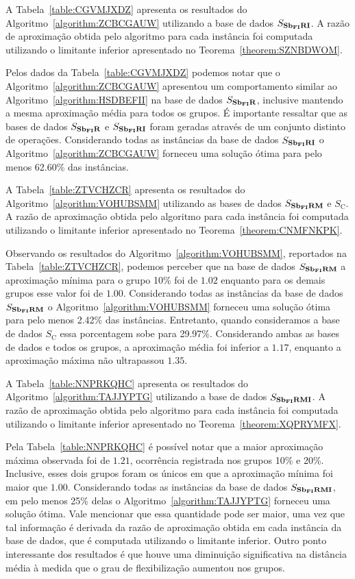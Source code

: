 A Tabela~\ref{table:CGVMJXDZ} apresenta os resultados do Algoritmo~\ref{algorithm:ZCBCGAUW} utilizando a base de dados $S_{\textbf{Sb\textsubscript{FI}RI}}{}$. A razão de aproximação obtida pelo algoritmo para cada instância foi computada utilizando o limitante inferior apresentado no Teorema~\ref{theorem:SZNBDWOM}.



Pelos dados da Tabela~\ref{table:CGVMJXDZ} podemos notar que o Algoritmo~\ref{algorithm:ZCBCGAUW} apresentou um comportamento similar ao Algoritmo~\ref{algorithm:HSDBEFII} na base de dados $S_{\textbf{Sb\textsubscript{FI}R}}{}$, inclusive mantendo a mesma aproximação média para todos os grupos. É importante ressaltar que as bases de dados $S_{\textbf{Sb\textsubscript{FI}R}}{}$ e $S_{\textbf{Sb\textsubscript{FI}RI}}{}$ foram geradas através de um conjunto distinto de operações. Considerando todas as instâncias da base de dados $S_{\textbf{Sb\textsubscript{FI}RI}}{}$ o Algoritmo~\ref{algorithm:ZCBCGAUW} forneceu uma solução ótima para pelo menos 62.60\% das instâncias.

A Tabela~\ref{table:ZTVCHZCR} apresenta os resultados do Algoritmo~\ref{algorithm:VOHUBSMM} utilizando as bases de dados $S_{\textbf{Sb\textsubscript{FI}RM}}{}$ e $S_{\text{C}}$. A razão de aproximação obtida pelo algoritmo para cada instância foi computada utilizando o limitante inferior apresentado no Teorema~\ref{theorem:CNMFNKPK}.



Observando os resultados do Algoritmo~\ref{algorithm:VOHUBSMM}, reportados na Tabela~\ref{table:ZTVCHZCR}, podemos perceber que na base de dados $S_{\textbf{Sb\textsubscript{FI}RM}}{}$ a aproximação mínima para o grupo 10\% foi de $1.02$ enquanto para os demais grupos esse valor foi de $1.00$. Considerando todas as instâncias da base de dados $S_{\textbf{Sb\textsubscript{FI}RM}}{}$ o Algoritmo~\ref{algorithm:VOHUBSMM} forneceu uma solução ótima para pelo menos 2.42\% das instâncias. Entretanto, quando consideramos a base de dados $S_{\text{C}}$ essa porcentagem sobe para 29.97\%. Considerando ambas as bases de dados e todos os grupos, a aproximação média foi inferior a $1.17$, enquanto a aproximação máxima não ultrapassou $1.35$.

A Tabela~\ref{table:NNPRKQHC} apresenta os resultados do Algoritmo~\ref{algorithm:TAJJYPTG} utilizando a base de dados $S_{\textbf{Sb\textsubscript{FI}RMI}}{}$. A razão de aproximação obtida pelo algoritmo para cada instância foi computada utilizando o limitante inferior apresentado no Teorema~\ref{theorem:XQPRYMFX}.



Pela Tabela~\ref{table:NNPRKQHC} é possível notar que a maior aproximação máxima observada foi de $1.21$, ocorrência registrada nos grupos 10\% e 20\%. Inclusive, esses dois grupos foram os únicos em que a aproximação mínima foi maior que $1.00$. Considerando todas as instâncias da base de dados $S_{\textbf{Sb\textsubscript{FI}RMI}}{}$, em pelo menos 25\% delas o Algoritmo~\ref{algorithm:TAJJYPTG} forneceu uma solução ótima. Vale mencionar que essa quantidade pode ser maior, uma vez que tal informação é derivada da razão de aproximação obtida em cada instância da base de dados, que é computada utilizando o limitante inferior. Outro ponto interessante dos resultados é que houve uma diminuição significativa na distância média à medida que o grau de flexibilização aumentou nos grupos.

